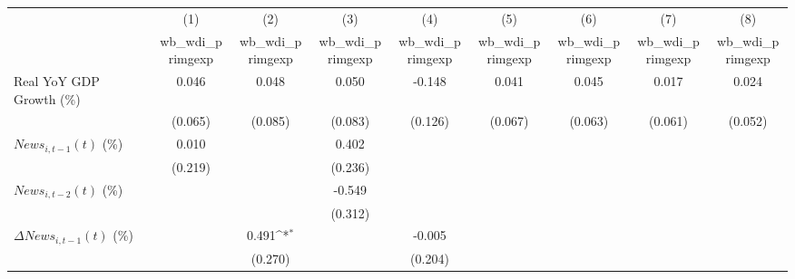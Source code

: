 {
\def\sym#1{\ifmmode^{#1}\else\(^{#1}\)\fi}
\begin{tabular}{l*{8}{c}}
\toprule
                    &\multicolumn{1}{c}{(1)}&\multicolumn{1}{c}{(2)}&\multicolumn{1}{c}{(3)}&\multicolumn{1}{c}{(4)}&\multicolumn{1}{c}{(5)}&\multicolumn{1}{c}{(6)}&\multicolumn{1}{c}{(7)}&\multicolumn{1}{c}{(8)}\\
                    &\multicolumn{1}{c}{wb_wdi_primgexp}&\multicolumn{1}{c}{wb_wdi_primgexp}&\multicolumn{1}{c}{wb_wdi_primgexp}&\multicolumn{1}{c}{wb_wdi_primgexp}&\multicolumn{1}{c}{wb_wdi_primgexp}&\multicolumn{1}{c}{wb_wdi_primgexp}&\multicolumn{1}{c}{wb_wdi_primgexp}&\multicolumn{1}{c}{wb_wdi_primgexp}\\
\midrule
Real YoY GDP Growth (\%)&       0.046         &       0.048         &       0.050         &      -0.148         &       0.041         &       0.045         &       0.017         &       0.024         \\
                    &     (0.065)         &     (0.085)         &     (0.083)         &     (0.126)         &     (0.067)         &     (0.063)         &     (0.061)         &     (0.052)         \\
\addlinespace
$ News_{i,t-1}(t)$ (\%)&       0.010         &                     &       0.402         &                     &                     &                     &                     &                     \\
                    &     (0.219)         &                     &     (0.236)         &                     &                     &                     &                     &                     \\
\addlinespace
$ News_{i,t-2}(t)$ (\%)&                     &                     &      -0.549         &                     &                     &                     &                     &                     \\
                    &                     &                     &     (0.312)         &                     &                     &                     &                     &                     \\
\addlinespace
$ \Delta News_{i,t-1}(t)$ (\%)&                     &       0.491\sym{*}  &                     &      -0.005         &                     &                     &                     &                     \\
                    &                     &     (0.270)         &                     &     (0.204)         &                     &                     &                     &                     \\

\end{tabular}}
